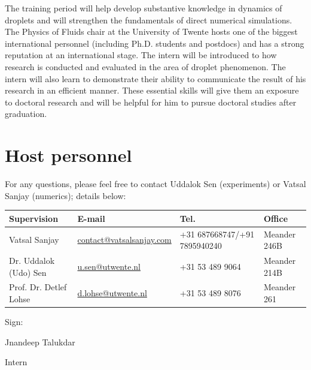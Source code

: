 \documentclass[a4paper,10pt]{article}
\begin{document}
The training period will help develop substantive knowledge in dynamics of droplets and will strengthen the fundamentals of direct numerical simulations. The Physics of Fluids chair at the University of Twente hosts one of the biggest international personnel (including Ph.D. students and postdocs) and has a strong reputation at an international stage. The intern will be introduced to how research is conducted and evaluated in the area of droplet phenomenon. The intern will also learn to demonstrate their ability to communicate the result of his research in an efficient manner. These essential skills will give them an exposure to doctoral research and will be helpful for him to pursue doctoral studies after graduation.


\section*{Host personnel}

For any questions, please feel free to contact Uddalok Sen (experiments) or Vatsal Sanjay (numerics); details below: 

\begin{center}
	\begin{tabular}{|l|l|l|l|}
		\hline \textbf{Supervision} & \textbf{E-mail} & \textbf{Tel.} & \textbf{Office} \\ 
		\hline Vatsal Sanjay & \href{mailto:contact@vatsalsanjay.com}{contact@vatsalsanjay.com} & +31 687668747/+91 7895940240 & Meander 246B \\ 
		\hline Dr. Uddalok (Udo) Sen & \href{mailto:u.sen@utwente.nl}{u.sen@utwente.nl} & +31 53 489 9064 & Meander 214B \\ 
		\hline Prof. Dr. Detlef Lohse & \href{mailto:d.lohse@utwente.nl}{d.lohse@utwente.nl} & +31 53 489 8076 & Meander 261 \\ 
		\hline 
	\end{tabular} 
\end{center}

\pagebreak

\vspace{20mm}

\noindent Sign: \hrulefill

\hspace*{0mm}\phantom{Sign: }Jnandeep Talukdar 

\hspace*{0mm}\phantom{Sign: }Intern

\vspace{20mm}
\end{document}
